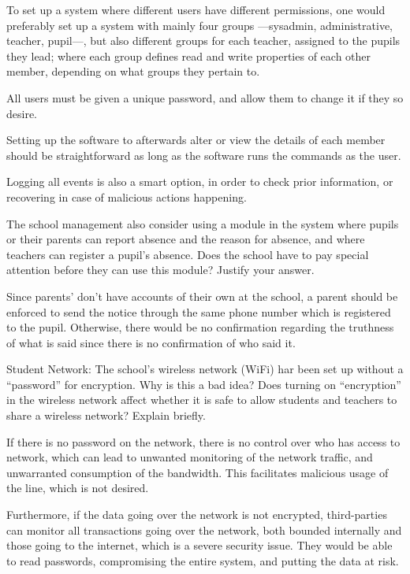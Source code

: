 \documentclass{myassignment}
\begin{document}
	\begin{answer}
		To set up a system where different users have different permissions, one would preferably set up a system with mainly four groups ---sysadmin, administrative, teacher, pupil---, but also different groups for each teacher, assigned to the pupils they lead; where each group defines read and write properties of each other member, depending on what groups they pertain to.

		All users must be given a unique password, and allow them to change it if they so desire. 

		Setting up the software to afterwards alter or view the details of each member should be straightforward as long as the software runs the commands as the user.

		Logging all events is also a smart option, in order to check prior information, or recovering in case of malicious actions happening.
	\end{answer}

	\begin{problem}
		The school management also consider using a module in the system where pupils or their parents can report absence and the reason for absence, and where teachers can register a pupil’s absence. Does the school have to pay special attention before they can use this module? Justify your answer.%
	\end{problem}

	\begin{answer}
		Since parents' don't have accounts of their own at the school, a parent should be enforced to send the notice through the same phone number which is registered to the pupil. Otherwise, there would be no confirmation regarding the truthness of what is said since there is no confirmation of who said it.
	\end{answer}

	\begin{problem}
		Student Network: The school’s wireless network (WiFi) har been set up without a ``password'' for encryption. Why is this a bad idea? Does turning on ``encryption'' in the wireless network affect whether it is safe to allow students and teachers to share a wireless network? Explain briefly.%
	\end{problem}

	\begin{answer}
		If there is no password on the network, there is no control over who has access to network, which can lead to unwanted monitoring of the network traffic, and unwarranted consumption of the bandwidth. This facilitates malicious usage of the line, which is not desired.

		Furthermore, if the data going over the network is not encrypted, third-parties can monitor all transactions going over the network, both bounded internally and those going to the internet, which is a severe security issue. They would be able to read passwords, compromising the entire system, and putting the data at risk.
	\end{answer}
\end{document}
